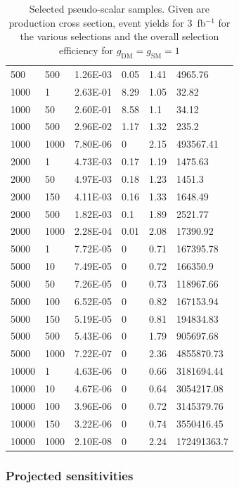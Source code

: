 \begin{table}[]
\begin{tabular}{llllll}
500   & 500  & 1.26E-03 & 0.05    & 1.41 & 4965.76     \\
1000  & 1    & 2.63E-01 & 8.29    & 1.05 & 32.82       \\
1000  & 50   & 2.60E-01 & 8.58    & 1.1  & 34.12       \\
1000  & 500  & 2.96E-02 & 1.17    & 1.32 & 235.2       \\
1000  & 1000 & 7.80E-06 & 0       & 2.15 & 493567.41   \\
2000  & 1    & 4.73E-03 & 0.17    & 1.19 & 1475.63     \\
2000  & 50   & 4.97E-03 & 0.18    & 1.23 & 1451.3      \\
2000  & 150  & 4.11E-03 & 0.16    & 1.33 & 1648.49     \\
2000  & 500  & 1.82E-03 & 0.1     & 1.89 & 2521.77     \\
2000  & 1000 & 2.28E-04 & 0.01    & 2.08 & 17390.92    \\
5000  & 1    & 7.72E-05 & 0       & 0.71 & 167395.78   \\
5000  & 10   & 7.49E-05 & 0       & 0.72 & 166350.9    \\
5000  & 50   & 7.26E-05 & 0       & 0.73 & 118967.66   \\
5000  & 100  & 6.52E-05 & 0       & 0.82 & 167153.94   \\
5000  & 150  & 5.19E-05 & 0       & 0.81 & 194834.83   \\
5000  & 500  & 5.43E-06 & 0       & 1.79 & 905697.68   \\
5000  & 1000 & 7.22E-07 & 0       & 2.36 & 4855870.73  \\
10000 & 1    & 4.63E-06 & 0       & 0.66 & 3181694.44  \\
10000 & 10   & 4.67E-06 & 0       & 0.64 & 3054217.08  \\
10000 & 100  & 3.96E-06 & 0       & 0.72 & 3145379.76  \\
10000 & 150  & 3.22E-06 & 0       & 0.74 & 3550416.45  \\
10000 & 1000 & 2.10E-08 & 0       & 2.24 & 172491363.7 \\ \hline
\end{tabular}
\caption{Selected pseudo-scalar samples. Given are production cross section, event yields for 3~fb$^{-1 }$ for the various selections and the overall selection efficiency for $g_\textrm{DM}=g_\textrm{SM}=1$}
\label{tab:dm_P_g1_3fb}
\end{table}



\subsubsection{Projected sensitivities}


